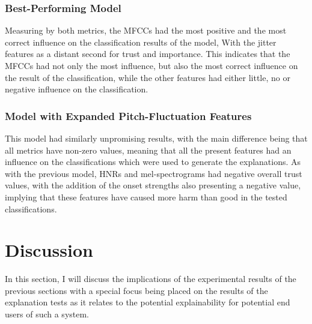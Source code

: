 \documentclass{article}
\begin{document}
		\subsubsection{Best-Performing Model}
		Measuring by both metrics, the MFCCs had the most positive and the most correct influence
		on the classification results of the model, With the jitter features as a distant second
		for trust and importance. This indicates that the MFCCs had not only the most influence,
		but also the most correct influence on the result of the classification, while the other
		features had either little, no or negative influence on the classification.
		\subsubsection{Model with Expanded Pitch-Fluctuation Features}
		This model had similarly unpromising results, with the main difference being that all
		metrics have non-zero values, meaning that all the present features had an influence on
		the classifications which were used to generate the explanations. As with the previous
		model, HNRs and mel-spectrograms had negative overall trust values, with the addition of
		the onset strengths also presenting a negative value, implying that these features have
		caused more harm than good in the tested classifications.
	\section{Discussion}
	In this section, I will discuss the implications of the experimental results of the previous
	sections with a special focus being placed on the results of the explanation tests as it
	relates to the potential explainability for potential end users of such a system.
\end{document}
